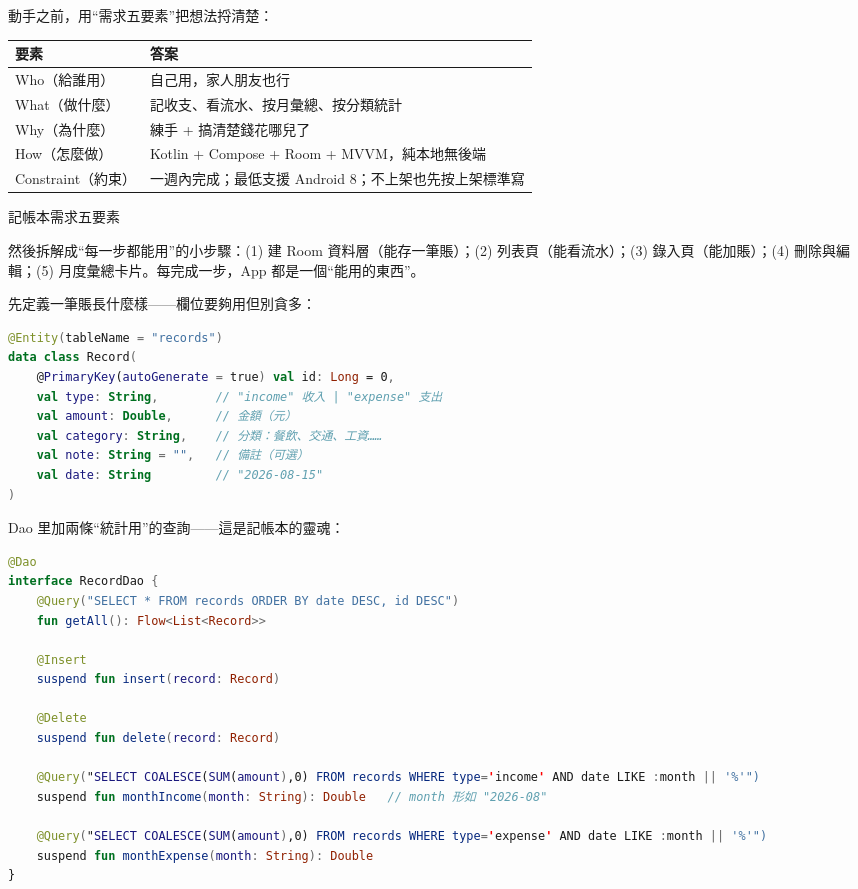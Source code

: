 


動手之前，用“需求五要素”把想法捋清楚：

\begin{center}
\begin{tabularx}{\linewidth}{|X|X|}
\hline
\textbf{要素} & \textbf{答案} \tabularnewline
\hline
Who（給誰用） & 自己用，家人朋友也行 \tabularnewline
What（做什麼） & 記收支、看流水、按月彙總、按分類統計 \tabularnewline
Why（為什麼） & 練手 + 搞清楚錢花哪兒了 \tabularnewline
How（怎麼做） & Kotlin + Compose + Room + MVVM，純本地無後端 \tabularnewline
Constraint（約束） & 一週內完成；最低支援 Android 8；不上架也先按上架標準寫 \tabularnewline
\hline
\end{tabularx}
\end{center}

\begin{center}\small\color{gray}記帳本需求五要素\end{center}

然後拆解成“每一步都能用”的小步驟：(1) 建 Room 資料層（能存一筆賬）；(2) 列表頁（能看流水）；(3) 錄入頁（能加賬）；(4) 刪除與編輯；(5) 月度彙總卡片。每完成一步，App 都是一個“能用的東西”。


先定義一筆賬長什麼樣——欄位要夠用但別貪多：

\begin{lstlisting}[language=Kotlin]
@Entity(tableName = "records")
data class Record(
    @PrimaryKey(autoGenerate = true) val id: Long = 0,
    val type: String,        // "income" 收入 | "expense" 支出
    val amount: Double,      // 金額（元）
    val category: String,    // 分類：餐飲、交通、工資……
    val note: String = "",   // 備註（可選）
    val date: String         // "2026-08-15"
)
\end{lstlisting}

Dao 里加兩條“統計用”的查詢——這是記帳本的靈魂：

\begin{lstlisting}[language=Kotlin]
@Dao
interface RecordDao {
    @Query("SELECT * FROM records ORDER BY date DESC, id DESC")
    fun getAll(): Flow<List<Record>>

    @Insert
    suspend fun insert(record: Record)

    @Delete
    suspend fun delete(record: Record)

    @Query("SELECT COALESCE(SUM(amount),0) FROM records WHERE type='income' AND date LIKE :month || '%'")
    suspend fun monthIncome(month: String): Double   // month 形如 "2026-08"

    @Query("SELECT COALESCE(SUM(amount),0) FROM records WHERE type='expense' AND date LIKE :month || '%'")
    suspend fun monthExpense(month: String): Double
}
\end{lstlisting}

